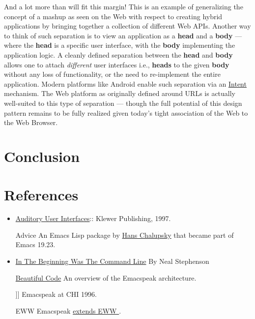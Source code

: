 \documentclass[11pt]{article}
\begin{document}
And a lot more than will fit this margin! This is an example of
generalizing the concept of a mashup as seen on the Web with
respect to creating hybrid applications by bringing together a
collection of different Web APIs. Another way to think of such
separation is to view an application as a \textbf{head} and a \textbf{body} —
where the \textbf{head} is a specific user interface, with the \textbf{body}
implementing the application logic. A cleanly defined separation
between the \textbf{head} and \textbf{body} allows one to attach \emph{different}
user interfaces i.e., \textbf{heads} to the given \textbf{body} without any
loss of functionality, or the need to re-implement the entire
application. Modern platforms like Android enable such separation
via an \href{http://developer.android.com/reference/android/content/Intent.html}{Intent} mechanism. The Web platform as originally defined
around URLs is actually well-suited to this type of separation —
though the full potential of this design pattern remains to be
fully realized given today's tight association of the Web to the
Web Browser.

\section{Conclusion}
\label{sec-16}








\section{References}
\label{sec-17}

\begin{itemize}
\item \href{http://emacspeak.sourceforge.net/raman/aui/aui.html}{Auditory User Interfaces}::  Klewer Publishing, 1997.
\item[{Advice }] An Emacs Lisp package by    \href{http://www.isi.edu/~hans/}{Hans Chalupsky} that
became part of Emacs 19.23.
\item \href{http://artlung.com/smorgasborg/C_R_Y_P_T_O_N_O_M_I_C_O_N.shtml}{In The Beginning Was The Command Line} By Neal Stephenson
\item[{\href{http://emacspeak.blogspot.com/2007/07/emacspeak-and-beautiful-code.html}{Beautiful Code}}] An overview of the Emacspeak architecture.
\item[{\label{http://emacspeak.sourceforge.net/raman/publications/chi96-emacspeak/-Speech-Enabled-Applications}]]}] Emacspeak at CHI 1996.
\item[{EWW}] Emacspeak  \href{http://emacspeak.blogspot.com/2014/05/emacspeak-eww-updates-for-complete.html}{extends EWW }.
\end{itemize}
\end{document}
